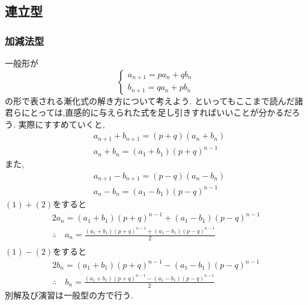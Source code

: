 \documentclass[dvipdfmx,a4paper,11pt,fleqn,openany]{jsbook}
\begin{document}
  \subsection{連立型}
    \subsubsection{加減法型}
      一般形が
      \[
        \begin{cases}
          a_{n+1}=pa_{n}+qb_{n} \\
          b_{n+1}=qa_{n}+pb_{n}
        \end{cases}
      \]
      の形で表される漸化式の解き方について考えよう.
      といってもここまで読んだ諸君らにとっては,直感的に与えられた式を足し引きすればいいことが分かるだろう.
      実際にすすめていくと,
      \begin{align*}
        &a_{n+1}+b_{n+1}=(p+q)(a_{n}+b_{n})\\
        &a_n+b_n=(a_1+b_1)(p+q)^{n-1}\tag{1}
      \end{align*}
      また,
      \begin{align*}
        &a_{n+1}-b_{n+1}=(p-q)(a_{n}-b_{n})\\
        &a_n-b_n=(a_1-b_1)(p-q)^{n-1}\tag{2}
      \end{align*}
      $(1)+(2)$をすると
      \begin{align*}
        2a_n=(a_1+b_1)(p+q)^{n-1}+(a_1-b_1)(p-q)^{n-1}\\
        \therefore \quad a_n=\frac{(a_1+b_1)(p+q)^{n-1}+(a_1-b_1)(p-q)^{n-1}}{2}\\
      \end{align*}
      $(1)-(2)$をすると
      \begin{align*}
        2b_n=(a_1+b_1)(p+q)^{n-1}-(a_1-b_1)(p-q)^{n-1}\\
        \therefore \quad b_n=\frac{(a_1+b_1)(p+q)^{n-1}-(a_1-b_1)(p-q)^{n-1}}{2}
      \end{align*}
      別解及び演習は一般型の方で行う.
\end{document}
